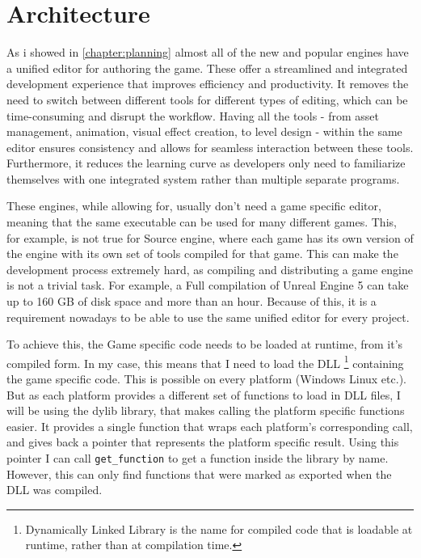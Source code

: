 \chapter{Architecture}

As i showed in \autoref{chapter:planning} almost all of the new and popular engines have a unified editor for authoring the game. These offer a streamlined and integrated development experience that improves efficiency and productivity. It removes the need to switch between different tools for different types of editing, which can be time-consuming and disrupt the workflow. Having all the tools - from asset management, animation, visual effect creation, to level design - within the same editor ensures consistency and allows for seamless interaction between these tools. Furthermore, it reduces the learning curve as developers only need to familiarize themselves with one integrated system rather than multiple separate programs.

These engines, while allowing for, usually don't need a game specific editor, meaning that the same executable can be used for many different games. This, for example, is not true for Source engine, where each game has its own version of the engine with its own set of tools compiled for that game. This can make the development process extremely hard, as compiling and distributing a game engine is not a trivial task. For example, a Full compilation of Unreal Engine 5 can take up to 160 GB of disk space and more than an hour. Because of this, it is a requirement nowadays to be able to use the same unified editor for every project.

To achieve this, the Game specific code needs to be loaded at runtime, from it's compiled form. In my case, this means that I need to load the DLL \footnote{Dynamically Linked Library is the name for compiled code that is loadable at runtime, rather than at compilation time.} containing the game specific code. This is possible on every platform (Windows Linux etc.). But as each platform provides a different set of functions to load in DLL files, I will be using the dylib \cite{dylib} library, that makes calling the platform specific functions easier. It provides a single function that wraps each platform's corresponding call, and gives back a pointer that represents the platform specific result. Using this pointer I can call \verb|get_function| to get a function inside the library by name. However, this can only find functions that were marked as exported when the DLL was compiled.

